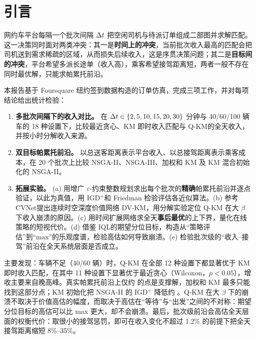 \section{引言}

网约车平台每隔一个批次间隔 $\Delta t$ 把空闲司机与待派订单组成二部图并求解匹配。这一决策同时面对两类冲突：其一是\textbf{时间上的冲突}，当前批次收入最高的匹配会把司机送到需求稀疏的区域，从而损失后续收入，这是序贯决策问题\cite{xu2018large,tang2019deep}；其二是\textbf{目标间的冲突}，平台希望多派长途单（收入高），乘客希望接驾距离短，两者一般不存在同时最优解，只能求帕累托前沿\cite{deb2002fast}。

本报告基于 Foursquare 纽约签到数据\cite{yang2015modeling}构造的订单仿真，完成三项工作，并对每项结论给出统计检验：

\begin{enumerate}[(1)]
	\item \textbf{多批次间隔下的收入对比。} 在 $\Delta t\in\{2,5,10,15,20,30\}$ 分钟与 40/60/100 辆车的 18 种设置下，比较最近贪心、KM 即时收入匹配\cite{kuhn1955hungarian}与 Q-KM\cite{xu2018large}的全天收入，并按小时分解收入来源。
	\item \textbf{双目标帕累托前沿。} 以总送客距离表示平台收入、以总接驾距离表示乘客成本，在 20 个批次上比较 NSGA-II\cite{deb2002fast}、NSGA-III\cite{deb2014evolutionary}、加权和 KM 及 KM 混合初始化的 NSGA-II。
	\item \textbf{拓展实验。} (a) 用增广 $\varepsilon$-约束整数规划\cite{haimes1971bicriterion,mavrotas2009effective}求出每个批次的\textbf{精确}帕累托前沿并逐点验证，以此为真值，用 IGD$^+$\cite{ishibuchi2015modified}和 Friedman 检验\cite{demsar2006statistical}评估各近似算法。(b) 参考 CVNet\cite{tang2019deep}提出连续时空深度价值网络 DV-KM，用分解实验定位 Q-KM 在大 $\beta$ 下收入崩溃的原因。(c) 用时间扩展网络求全天\textbf{事后最优}的上下界，量化在线策略的短视代价。(d) 借鉴 IQL\cite{kostrikov2022offline}的期望分位目标，构造从“策略评估”到“max”的乐观度谱，检验高估如何导致崩溃。(e) 检验批次级的“收入–接驾”前沿在全天系统层面是否成立。
\end{enumerate}

主要发现：车辆不足（40/60 辆）时，Q-KM 在全部 12 种设置下都显著优于 KM 即时收入匹配，在其中 11 种设置下显著优于最近贪心（Wilcoxon，$p<0.05$），增收主要来自晚高峰\HINDSIGHTINTRO。真实帕累托前沿上仅约 \supfrac 的点是支撑解，加权和 KM 最多只能找到这部分点；KM 初始化把 NSGA-II 的 IGD$^+$ 降低约 \initgain。Q-KM 在大 $\beta$ 下的崩溃不取决于价值高估的幅度，而取决于高估在“等待”与“出发”之间的不对称：期望分位目标的高估可以比 max 更大，却不会崩溃。最后，批次级前沿会高估全天层面的权衡代价：取很小的接驾惩罚，即可在收入变化不超过 1.2\% 的前提下把全天接驾距离缩短 8\%–35\%。
